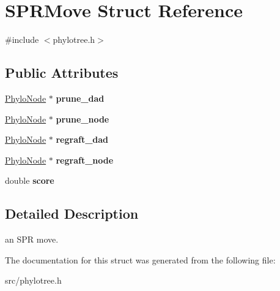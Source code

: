 \hypertarget{structSPRMove}{
\section{SPRMove Struct Reference}
\label{structSPRMove}
}


{\ttfamily \#include $<$phylotree.h$>$}\subsection*{Public Attributes}
\begin{DoxyCompactItemize}
\item 
\hypertarget{structSPRMove_af376cb761f6ce516ed57e85e09fbbade}{
\hyperlink{classPhyloNode}{PhyloNode} $\ast$ {\bfseries prune\_\-dad}}
\label{structSPRMove_af376cb761f6ce516ed57e85e09fbbade}

\item 
\hypertarget{structSPRMove_ac984f5c782a61af1e776a5f468676248}{
\hyperlink{classPhyloNode}{PhyloNode} $\ast$ {\bfseries prune\_\-node}}
\label{structSPRMove_ac984f5c782a61af1e776a5f468676248}

\item 
\hypertarget{structSPRMove_ae662434f95ac35c25962321f5d4a9dc0}{
\hyperlink{classPhyloNode}{PhyloNode} $\ast$ {\bfseries regraft\_\-dad}}
\label{structSPRMove_ae662434f95ac35c25962321f5d4a9dc0}

\item 
\hypertarget{structSPRMove_a5ddd25a002ae15e3894d379349546e8e}{
\hyperlink{classPhyloNode}{PhyloNode} $\ast$ {\bfseries regraft\_\-node}}
\label{structSPRMove_a5ddd25a002ae15e3894d379349546e8e}

\item 
\hypertarget{structSPRMove_aba800bc1903d31eb0594abfcaa2df4e3}{
double {\bfseries score}}
\label{structSPRMove_aba800bc1903d31eb0594abfcaa2df4e3}

\end{DoxyCompactItemize}


\subsection{Detailed Description}
an SPR move. 

The documentation for this struct was generated from the following file:\begin{DoxyCompactItemize}
\item 
src/phylotree.h\end{DoxyCompactItemize}
